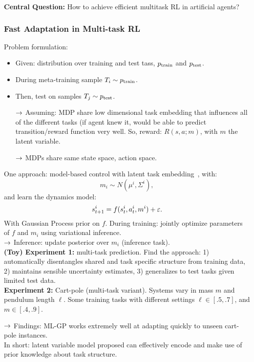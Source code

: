 {\bf Central Question:} How to achieve efficient multitask RL in artificial agents?

\subsubsection{Fast Adaptation in Multi-task RL}

Problem formulation:
\begin{itemize}
    \item Given: distribution over training and test tass, $p_{\text{train}}$ and $p_{\text{test}}$.
    \item During meta-training sample $T_i \sim p_{\text{train}}$.
    \item Then, test on samples $T_j \sim p_{\text{test}}$.
    
    $\rightarrow$ Assuming: MDP share low dimensional task embedding that influences all of the different tasks (if agent knew it, would be able to predict transition/reward function very well. So, reward: $R(s,a;m)$, with $m$ the latent variable.
    
    $\rightarrow$ MDPs share same state space, action space.
\end{itemize}

One approach: model-based control with latent task embedding~\cite{saemundsson2018meta}, with:
\[
m_i \sim N(\mu^i, \Sigma^i),
\]
and learn the dynamics model:
\[
s_{t+1}^i = f(s_t^i, a_t^i, m^i) + \varepsilon.
\]
With Gaussian Process prior on $f$. During training: jointly optimize parameters of $f$ and $m_i$ using variational inference. \\

$\rightarrow$ Inference: update posterior over $m_i$ (inference task). \\

{\bf (Toy) Experiment 1:} multi-task prediction. Find the approach: 1) automatically disentangles shared and task specific structure from training data, 2) maintains sensible uncertainty estimates, 3) generalizes to test tasks given limited test data. \\

{\bf Experiment 2:} Cart-pole (multi-task variant). Systems vary in mass $m$ and pendulum length $\ell$. Some training tasks with different settings $\ell \in [.5, .7]$, and $m \in [.4,.9]$. 

$\rightarrow$ Findings: ML-GP works extremely well at adapting quickly to unseen cart-pole instances. \\

In short: latent variable model proposed can effectively encode and make use of prior knowledge about task structure.

